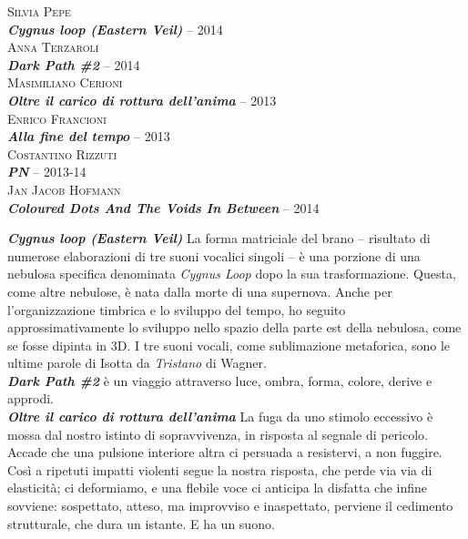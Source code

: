 \documentclass[9pt, twoside, a5paper]{extreport}
\newcommand{\descrizione}[2]{%
\noindent \textbf{\textit{#1}} %
#2 %
\\
}%
\newcommand{\acusmatico}[3]{%
\noindent \textsc{#1}\\ %
\noindent \textbf{\textit{#2}} -- #3%
\\
}%
\begin{document}
\begin{multicols}{2}

\acusmatico{Silvia Pepe}
{Cygnus loop (Eastern Veil)}{2014}


\acusmatico{Anna Terzaroli}
{Dark Path \#2}{2014}


\acusmatico{Masimiliano Cerioni}
{Oltre il carico di rottura dell'anima}{2013}


\acusmatico{Enrico Francioni}
{Alla fine del tempo}{2013}


\acusmatico{Costantino Rizzuti}
{PN}{2013-14}


\acusmatico{Jan Jacob Hofmann}
{Coloured Dots And The Voids In Between}{2014}

%
%
\vspace{5.5cm}

\descrizione{Cygnus loop (Eastern Veil)}{La forma matriciale del brano -- risultato di numerose elaborazioni di tre suoni vocalici singoli -- è una porzione di una nebulosa specifica denominata \textit{Cygnus Loop} dopo la sua trasformazione. Questa, come altre nebulose, è nata dalla morte di una supernova. Anche per l'organizzazione timbrica e lo sviluppo del tempo, ho seguito approssimativamente lo sviluppo nello spazio della parte est della nebulosa, come se fosse dipinta in 3D. I tre suoni vocali, come sublimazione metaforica, sono le ultime parole di Isotta da \textit{Tristano} di Wagner.}



\descrizione{Dark Path \#2}{è un viaggio attraverso luce, ombra, forma, colore, derive e approdi.}


\descrizione{Oltre il carico di rottura dell'anima}{La fuga da uno stimolo eccessivo è mossa dal nostro istinto di sopravvivenza, in risposta al segnale di pericolo. Accade che una pulsione interiore altra ci persuada a resistervi, a non fuggire. Così a ripetuti impatti violenti segue la nostra risposta, che perde via via di elasticità; ci deformiamo, e una flebile voce ci anticipa la disfatta che infine sovviene: sospettato, atteso, ma improvviso e inaspettato, perviene il cedimento strutturale, che dura un istante. E ha un suono.}



\end{multicols}
\end{document}
